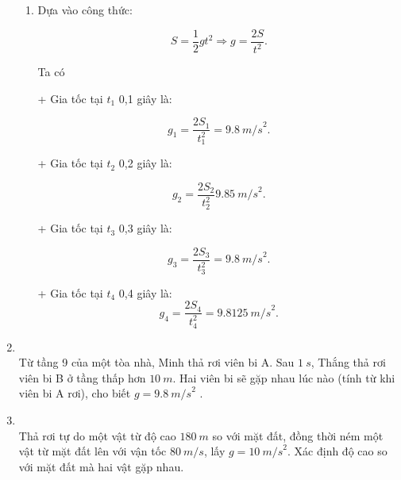 \begin{enumerate}[label=\bfseries Bài \arabic*:]
{\begin{enumerate}[label=\alph*)]
			Như vậy, sau cùng 1 khoảng là 0,1 giây như nhau nhưng vật rơi được những khoảng khác nhau, càng về sau thì rơi càng nhanh hơn. 
			
			\item Dựa vào công thức:
			
			$$S = \dfrac{1}{2}gt^2 \Rightarrow g = \dfrac{2S}{t^2}.$$
			
			Ta có
			
			+ Gia tốc tại $t_1$  0,1 giây là: 
			
			$$g_1 = \dfrac{2 S_1}{t_1^2}= \SI{9,8}{m/s}^2.$$
			
			+ Gia tốc tại $t_2$ 0,2 giây là: 
			
			$$g_2 = \dfrac{2 S_2}{t_2^2}\SI{9,85}{m/s}^2.$$
			
			+ Gia tốc tại $t_3$ 0,3 giây là: 
			
			$$g_3 = \dfrac{2 S_3}{t_3^2}=\SI{9,8}{m/s}^2.$$
			
			+ Gia tốc tại $t_4$ 0,4 giây là: 
			$$g_4 = \dfrac{2S_4}{t_4^2}=\SI{9,8125}{m/s}^2.$$
			
			
		\end{enumerate}
	}

	\item {}\\
	{
		Từ tầng 9 của một tòa nhà, Minh thả rơi viên bi A. Sau $\SI{1}{s}$, Thắng thả rơi viên bi B ở tầng thấp hơn $\SI{10}{m}$. Hai viên bi sẽ gặp nhau lúc nào (tính từ khi viên bi A rơi), cho biết $g =\SI{9,8}{m/s}^2$ .
	}

\item {}\\
{Thả rơi tự do một vật từ độ cao $\SI{180}{m}$ so với mặt đất, đồng thời ném một vật từ mặt đất lên với vận tốc $\SI{80}{m/s}$, lấy $g = \SI{10}{m/s}^2$. Xác định độ cao so với mặt đất mà hai vật gặp nhau.
}
\end{enumerate}
